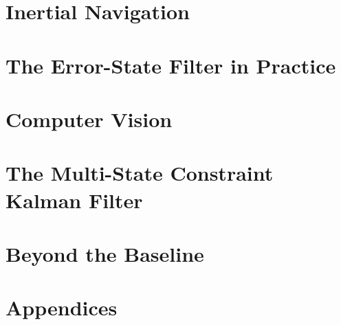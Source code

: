 \documentclass[11pt, a4paper, oneside, openany]{book}
\begin{document}
\part{Inertial Navigation}




\part{The Error-State Filter in Practice}



\part{Computer Vision}





\part{The Multi-State Constraint Kalman Filter}






\part{Beyond the Baseline}



\appendix
{}
\part*{Appendices} %




\ifsolutions

\fi

\backmatter

\printindex
\end{document}
